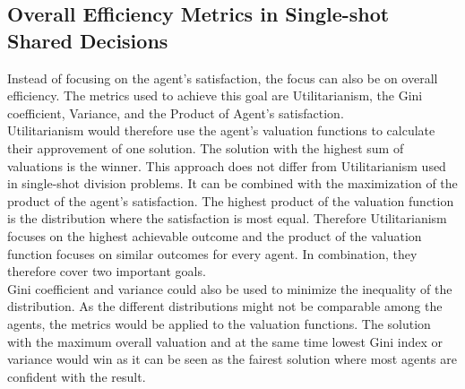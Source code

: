 \documentclass[german, a4paper, 11pt, oneside]{scrbook}
\begin{document}
\subsection{Overall Efficiency Metrics in Single-shot Shared Decisions}
Instead of focusing on the agent's satisfaction, the focus can also be on overall efficiency. The metrics used to achieve this goal are Utilitarianism, the Gini coefficient, Variance, and the Product of Agent's satisfaction. \\Utilitarianism would therefore use the agent's valuation functions to calculate their approvement of one solution. The solution with the highest sum of valuations is the winner. This approach does not differ from Utilitarianism used in single-shot division problems. It can be combined with the maximization of the product of the agent's satisfaction. The highest product of the valuation function is the distribution where the satisfaction is most equal. Therefore Utilitarianism focuses on the highest achievable outcome and the product of the valuation function focuses on similar outcomes for every agent. In combination, they therefore cover two important goals.
\\Gini coefficient and variance could also be used to minimize the inequality of the distribution. As the different distributions might not be comparable among the agents, the metrics would be applied to the valuation functions. The solution with the maximum overall valuation and at the same time lowest Gini index or variance would win as it can be seen as the fairest solution where most agents are confident with the result.
\end{document}
